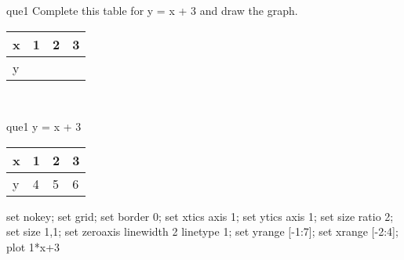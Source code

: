\documentclass[13.5pt, varwidth=true]{beamer}
\begin{document}
\begin{frame}[shrink=19,fragile]
	\begin{beamercolorbox}[rounded=true, left, shadow=true,wd=14.8cm]{que1}
		 Complete this table for y = x + 3 and draw the graph. \\[0.3cm] \renewcommand{\arraystretch}{1.2}\begin{tabular}{|C|C|C|C|} \hline x & 1 & 2 & 3 \\ \hline y & & & \\ \hline \end{tabular}\\[0.3cm]
	\end{beamercolorbox}
\end{frame}
\begin{frame}[shrink=19,fragile]
	\begin{beamercolorbox}[rounded=true, left, shadow=true,wd=14.8cm]{que1}
		y = x + 3\renewcommand{\arraystretch}{1.2}\begin{tabular}{|C|C|C|C|} \hline x & 1 & 2 & 3 \\ \hline y & 4 & 5 & 6\\ \hline \end{tabular}\begin{gnuplot}[terminal=pdf] set nokey; set grid; set border 0; set xtics axis 1; set ytics axis 1; set size ratio 2; set size 1,1; set zeroaxis linewidth 2 linetype 1; set yrange [-1:7]; set xrange [-2:4]; plot 1*x+3 \end{gnuplot}
	\end{beamercolorbox}
\end{frame}
\end{document}
